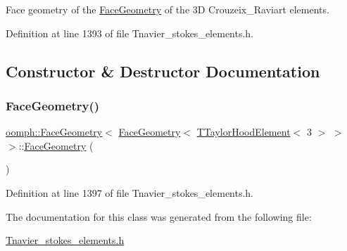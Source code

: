 Face geometry of the \hyperlink{classoomph_1_1FaceGeometry}{Face\+Geometry} of the 3D Crouzeix\+\_\+\+Raviart elements. 

Definition at line 1393 of file Tnavier\+\_\+stokes\+\_\+elements.\+h.



\subsection{Constructor \& Destructor Documentation}
\mbox{\label{classoomph_1_1FaceGeometry_3_01FaceGeometry_3_01TTaylorHoodElement_3_013_01_4_01_4_01_4_ac4203f76b19c8548b6de405236cb9442}} 
\subsubsection{\texorpdfstring{Face\+Geometry()}{FaceGeometry()}}
{\footnotesize\ttfamily \hyperlink{classoomph_1_1FaceGeometry}{oomph\+::\+Face\+Geometry}$<$ \hyperlink{classoomph_1_1FaceGeometry}{Face\+Geometry}$<$ \hyperlink{classoomph_1_1TTaylorHoodElement}{T\+Taylor\+Hood\+Element}$<$ 3 $>$ $>$ $>$\+::\hyperlink{classoomph_1_1FaceGeometry}{Face\+Geometry} (\begin{DoxyParamCaption}{ }\end{DoxyParamCaption})\hspace{0.3cm}{\ttfamily [inline]}}



Definition at line 1397 of file Tnavier\+\_\+stokes\+\_\+elements.\+h.



The documentation for this class was generated from the following file\+:\begin{DoxyCompactItemize}
\item 
\hyperlink{Tnavier__stokes__elements_8h}{Tnavier\+\_\+stokes\+\_\+elements.\+h}\end{DoxyCompactItemize}
